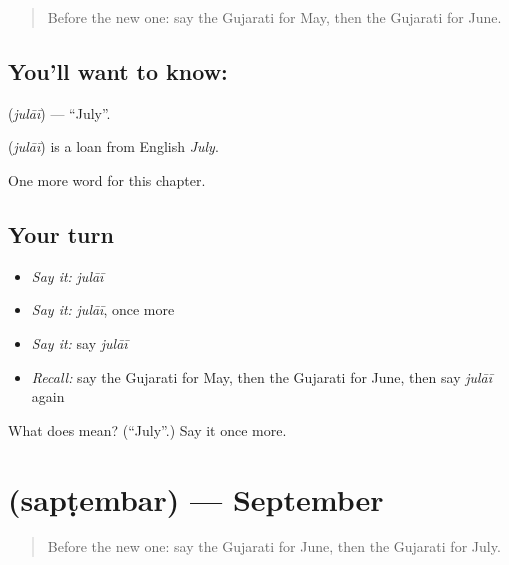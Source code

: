 \label{lesson:GU-C96-julai}



\begin{quote}
Before the new one: say the Gujarati for May, then the Gujarati for June.
\end{quote}

\subsection*{You'll want to know: }
\textbf{} (\emph{julāī}) — \textquotedblleft{}July\textquotedblright{}.

\begin{cousinweb}
\textbf{} (\emph{julāī}) is a loan from English \emph{July}.
\end{cousinweb}

\begin{grammarlens}[title={What you've built}]
One more word for this chapter.
\end{grammarlens}

\subsection*{Your turn}
\begin{itemize}
\raggedright
  \item \emph{Say it:} \emph{julāī}
  \item \emph{Say it:} \emph{julāī}, once more
  \item \emph{Say it:} say \emph{julāī}
  \item \emph{Recall:} say the Gujarati for May, then the Gujarati for June, then say \emph{julāī} again
\end{itemize}

\begin{tcolorbox}[breakable,colback=teal!4,colframe=teal!35!black,title={Before you move on}]
What does  mean? (\textquotedblleft{}July\textquotedblright{}.) Say it once more.
\end{tcolorbox}
\section[\texorpdfstring{\gu{સપ્ટેમ્બર} (sapṭembar)}{સપ્ટેમ્બર (sapṭembar)}]{ (sapṭembar) — September}

\label{lesson:GU-C96-saptembar}



\begin{quote}
Before the new one: say the Gujarati for June, then the Gujarati for July.
\end{quote}

